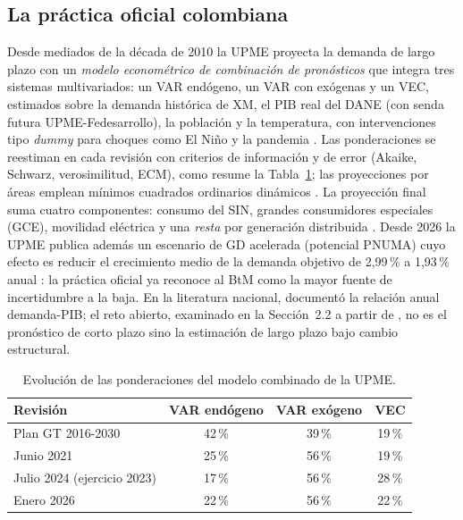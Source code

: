 \documentclass[11pt,letterpaper]{article}
\begin{document}
\subsection{La práctica oficial colombiana}

Desde mediados de la década de 2010 la UPME proyecta la demanda de largo
plazo con un \emph{modelo econométrico de combinación de pronósticos}
\cite{castano1994} que integra tres sistemas multivariados: un VAR endógeno,
un VAR con exógenas y un VEC, estimados sobre la demanda histórica de XM, el
PIB real del DANE (con senda futura UPME-Fedesarrollo), la población y la
temperatura, con intervenciones tipo \emph{dummy} para choques como El Niño y
la pandemia \cite{upme2024,plangt2016}. Las ponderaciones se reestiman en
cada revisión con criterios de información y de error (Akaike, Schwarz,
verosimilitud, ECM), como resume la Tabla~\ref{tab:pesos}; las proyecciones
por áreas emplean mínimos cuadrados ordinarios dinámicos
\cite{masih1996,upme2024}. La proyección final suma cuatro componentes:
consumo del SIN, grandes consumidores especiales (GCE), movilidad eléctrica y
una \emph{resta} por generación distribuida \cite{upme2024}. Desde 2026 la
UPME publica además un escenario de GD acelerada (potencial PNUMA) cuyo
efecto es reducir el crecimiento medio de la demanda objetivo de 2,99\,\% a
1,93\,\% anual \cite{upme2026}: la práctica oficial ya reconoce al BtM como
la mayor fuente de incertidumbre a la baja. En la literatura nacional,
\cite{grimaldo2021} documentó la relación anual demanda-PIB; el reto
abierto, examinado en la Sección~2.2 a partir de \cite{vargas2025}, no es el
pronóstico de corto plazo sino la estimación de largo plazo bajo cambio
estructural.

\begin{table}[htb]\centering\small
\caption{Evolución de las ponderaciones del modelo combinado de la UPME.}
\label{tab:pesos}
\begin{tabular}{lccc}
\toprule
Revisión & VAR endógeno & VAR exógeno & VEC\\
\midrule
Plan GT 2016-2030 \cite{plangt2016} & 42\,\% & 39\,\% & 19\,\%\\
Junio 2021 \cite{upme2021} & 25\,\% & 56\,\% & 19\,\%\\
Julio 2024 (ejercicio 2023) \cite{upme2024} & 17\,\% & 56\,\% & 28\,\%\\
Enero 2026 \cite{upmeene2026} & 22\,\% & 56\,\% & 22\,\%\\
\bottomrule
\end{tabular}
\end{table}
\end{document}
